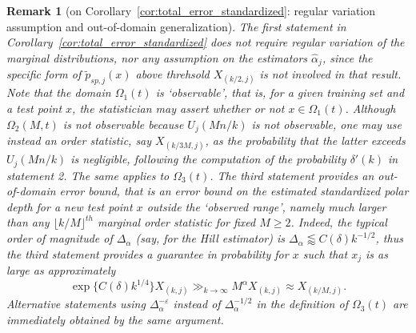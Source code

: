 \documentclass{article}
\numberwithin{equation}{section}
\newtheorem{remark}{Remark}[section]
\begin{document}
 \begin{remark}[on Corollary~\ref{cor:total_error_standardized}: regular variation assumption and out-of-domain generalization]
   The first statement in Corollary~\ref{cor:total_error_standardized} does not require regular variation of the marginal distributions, nor any assumption on the estimators $\hat \alpha_j$,  since the specific form of $\tilde{p}_{sp,j}(x)$ above threhsold $X_{(k/2,j)}$ is not involved in that result.
   Note that the domain $\Omega_1(t)$ is `observable', that is, for a given training set and a test point $x$, the statistician  may assert whether or not $x\in \Omega_1(t)$. Although $\Omega_2(M,t)$ is not observable because $U_j(Mn/k)$ is not observable, one may use instead an order statistic, say $X_{(k/3M,j)}$, as the probability that the latter exceeds $U_j(Mn/k)$ is negligible, following the computation of the probability $\delta'(k)$ in statement 2.
   The same  applies to $\Omega_3(t)$. 
The third statement provides an \emph{out-of-domain} error bound, that is an error bound on the estimated standardized polar depth for a new test point $x$ outside the `observed range', namely much larger than any $\lfloor k/M\rfloor ^{th}$ marginal order statistic for fixed $M\ge 2$. Indeed, the typical order of magnitude of  $\Delta_\alpha$ (say, for the Hill estimator) is $\Delta_\alpha \lessapprox C(\delta) k^{-1/2}$, thus the third statement provides a guarantee in probability  for $x$ such that $x_j$ is as large as approximately 
   $$
 \exp\{ C(\delta) k^{1/4} \} X_{(k,j)} \gg_{k\to\infty} M^\alpha X_{(k,j)} \approx X_{(k/M, j)}. 
   $$
Alternative statements using $\Delta_\alpha^{-\varepsilon}$ instead of $\Delta_\alpha^{-1/2}$ in the definition of $\Omega_3(t)$ are immediately obtained by the same argument. 

   
 \end{remark}
 
  
\end{document}
